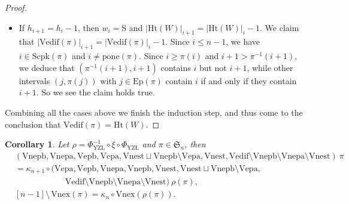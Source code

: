 \documentclass[12pt]{amsart}
\numberwithin{equation}{section}
\theoremstyle{plain}
\newtheorem{corollary}[theorem]{Corollary}
\theoremstyle{definition}
\def\YZL{\mathrm{YZL}}
\def\SS{\mathfrak{S}}
\def\S{\mathrm{S}}
\def\dE{\mathrm{dE}}
\def\Het{\mathrm{Ht}}
\def\Excp{\mathrm{Ep}}
\def\Scpk{\mathrm{Scpk}}
\def\Scdd{\mathrm{Scdd}}
\def\Vnexpb{\mathrm{Vnepb}}
\def\Vnexpa{\mathrm{Vnepa}}
\def\Vexpb{\mathrm{Vepb}}
\def\Vexpa{\mathrm{Vepa}}
\def\Vedif{\mathrm{Vedif}}
\def\Vnex{\mathrm{Vnex}}
\def\Vnest{\mathrm{Vnest}}
\def\pone{\mathrm{pone}}
\begin{document}
\begin{proof}
\begin{itemize}
\begin{itemize}
           \item If $w_i=\dE$, then we see that $i\in \Scdd(\pi)$ and $i \neq \pone(\pi)$. Since $i \geq \pi(i)$ and $i+1 \leq \pi^{-1}(i+1)$, we deduce that for every $j\in\Excp(\pi)$, the interval $(j,\pi(j))$ contains $i$ if and only if it contains $i+1$. Since $i \neq \pone(\pi)$, we see $(\pone(\pi),n]$ contains $i$ if and only if it contains $i+1$. So in this case $|\Vedif(\pi)|_{i+1}=|\Vedif(\pi)|_{i}$ holds as well.
    \end{itemize}

  \item If $h_{i+1}=h_i-1$, then $w_i=\S$ and
        $|\Het(W)|_{i+1}=|\Het(W)|_{i}-1$. We claim that $|\Vedif(\pi)|_{i+1}=|\Vedif(\pi)|_{i}-1$. Since $i \leq n-1$, we have $i\in \Scpk(\pi)$ and $i \neq \pone(\pi)$.
        Since $i\geq\pi(i)$ and $i+1>\pi^{-1}(i+1)$, we deduce that $(\pi^{-1}(i+1),i+1)$ contains $i$ but not $i+1$, while other intervals $(j,\pi(j))$ with $j\in\Excp(\pi)$ contain $i$ if and only if they contain $i+1$. So we see the claim holds true.
\end{itemize}

Combining all the cases above we finish the induction step, and thus come to the conclusion that $\Vedif(\pi)=\Het(W)$.
\end{proof}




\begin{corollary}
Let $\rho=\Phi_{\YZL}^{-1}\circ \xi \circ \Phi_{\YZL}$ and $\pi \in \SS_n$, then
\begin{align*}
  &(\Vnexpb,\Vnexpa,\Vexpb,\Vexpa,\Vnest \sqcup \Vnexpb \setminus \Vexpa ,\Vnest,\Vedif  \setminus \Vnexpb\setminus\Vnexpa \setminus \Vnest) \: \pi \\[4pt]
&=\kappa_{n+1} \circ (\Vexpa,\Vexpb,\Vnexpa,\Vnexpb,\Vnest,\Vnest \sqcup \Vnexpb \setminus \Vexpa,\\
&\qquad\qquad\qquad \Vedif  \setminus \Vnexpb\setminus\Vnexpa\setminus \Vnest) \:\rho(\pi),\\[4pt]
&[n-1] \setminus\,  \Vnex(\pi)=  \kappa_{n} \circ \Vnex(\rho(\pi)).
 

\end{align*}


 
  


\end{corollary}
\end{document}

